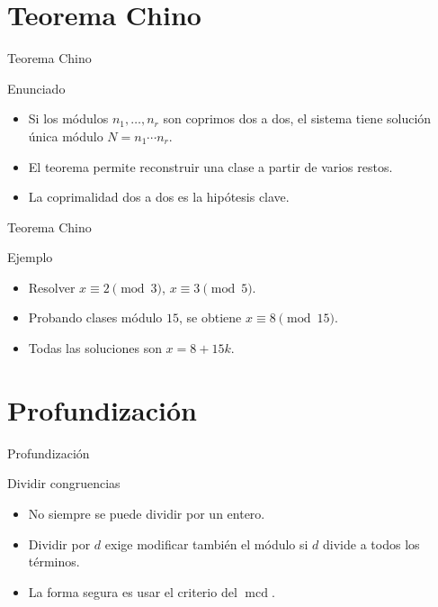 \documentclass[aspectratio=169,11pt]{beamer}
\newcommand{\mcd}{\operatorname{mcd}}
\begin{document}
\section{Teorema Chino}

\begin{frame}{Teorema Chino}
\begin{block}{Enunciado}
\begin{itemize}
  \item Si los módulos \(n_1,\ldots,n_r\) son coprimos dos a dos, el sistema tiene solución única módulo \(N=n_1\cdots n_r\).
  \item El teorema permite reconstruir una clase a partir de varios restos.
  \item La coprimalidad dos a dos es la hipótesis clave.
\end{itemize}
\end{block}
\end{frame}

\begin{frame}{Teorema Chino}
\begin{block}{Ejemplo}
\begin{itemize}
  \item Resolver \(x\equiv 2\pmod 3\), \(x\equiv 3\pmod 5\).
  \item Probando clases módulo \(15\), se obtiene \(x\equiv 8\pmod {15}\).
  \item Todas las soluciones son \(x=8+15k\).
\end{itemize}
\end{block}
\end{frame}

\section{Profundización}

\begin{frame}{Profundización}
\begin{block}{Dividir congruencias}
\begin{itemize}
  \item No siempre se puede dividir por un entero.
  \item Dividir por \(d\) exige modificar también el módulo si \(d\) divide a todos los términos.
  \item La forma segura es usar el criterio del \(\mcd\).
\end{itemize}
\end{block}
\end{frame}
\end{document}
